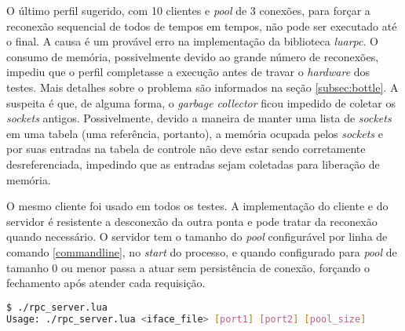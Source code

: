 \documentclass[11pt]{article}
\begin{document}
O último perfil sugerido, com 10 clientes e \textit{pool} de 3 conexões, para
forçar a reconexão sequencial de todos de tempos em tempos, não pode ser
executado até o final. A causa é um provável erro na implementação da biblioteca
\textit{luarpc}. O consumo de memória, possivelmente devido ao grande número de
reconexões, impediu que o perfil completasse a execução antes de travar o
\textit{hardware} dos testes. Mais detalhes sobre o problema são informados na
seção \ref{subsec:bottle}. A suspeita é que, de alguma forma, o \textit{garbage
collector} ficou impedido de coletar os \textit{sockets} antigos. Possivelmente,
devido a maneira de manter uma lista de \textit{sockets} em uma tabela (uma
referência, portanto), a memória ocupada pelos \textit{sockets} e por suas
entradas na tabela de controle não deve estar sendo corretamente
desreferenciada, impedindo que as entradas sejam coletadas para liberação de
memória.

O mesmo cliente foi usado em todos os testes. A implementação do cliente e do
servidor é resistente a desconexão da outra ponta e pode tratar da reconexão
quando necessário. O servidor tem o tamanho do \textit{pool} configurável por
linha de comando \ref{commandline}, no \textit{start} do processo, e quando
configurado para \textit{pool} de tamanho 0 ou menor passa a atuar sem
persistência de conexão, forçando o fechamento após atender cada requisição.

\begin{lstlisting}[label={commandline},language=sh,caption=Linha de comando]
$ ./rpc_server.lua
Usage: ./rpc_server.lua <iface_file> [port1] [port2] [pool_size]
\end{lstlisting}
\end{document}

